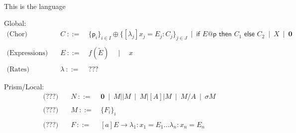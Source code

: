 This is the language

\newcommand{\role}[1]{\textsf{#1}}
\newcommand{\CEnd}{\mathbf{0}}
\newcommand{\pp}{|\!|}
\newcommand{\ppp}[1]{|[A]|}


Global: 
\begin{displaymath}
  \begin{array}{lll}
    \text{(Chor)}  \quad & C \ ::=\ & \{\role p_i\}_{i\in I}\oplus\{[\lambda_j] x_j=E_j: C_j\}_{j\in J}\ \mid\
    \textsf{if } E@\role{p} \textsf{ then } C_1 \textsf{ else } C_2 \ \mid\ X\ \mid\ \CEnd\\\\
    \text{(Expressions)}\quad & E \ ::=\ & f(\tilde E)\quad\mid\quad x\\\\
    \text{(Rates)}\quad       & \lambda\ ::=\ & ???                                            
  \end{array}
\end{displaymath}


Prism/Local: 
\begin{displaymath}
  \begin{array}{lll}
    \text{(???)}  \quad & N \ ::=\ & \CEnd \ \mid\ M \pp M\ \mid\ M \ppp A M\ \mid\ M/A\ \mid\ \sigma M\\\\
    \text{(???)}  \quad & M \ ::=\ & \{F_i\}_i\\\\
    \text{(???)}  \quad & F \ ::=\ & [a] E \rightarrow \lambda_1: x_1 = E_1\ldots\lambda_n: x_n = E_n\\\\
  \end{array}
\end{displaymath}



